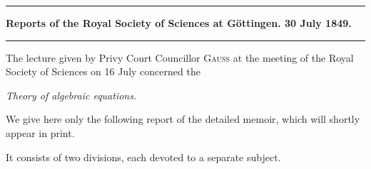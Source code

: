 \clearpage
{}
\par\noindent\hfill\rule{0.30\linewidth}{0.4pt}\hfill\mbox{}\par
\begin{center}
\textbf{Reports of the Royal Society of Sciences at Göttingen. 30 July 1849.}
\end{center}

\par\noindent\hfill\rule{0.30\linewidth}{0.4pt}\hfill\mbox{}\par

The lecture given by Privy Court Councillor \textsc{Gauss} at the meeting of the Royal Society of Sciences on 16 July concerned the
\begin{center}
\textit{Theory of algebraic equations.}
\end{center}
We give here only the following report of the detailed memoir, which will shortly appear in print.

It consists of two divisions, each devoted to a separate subject.

